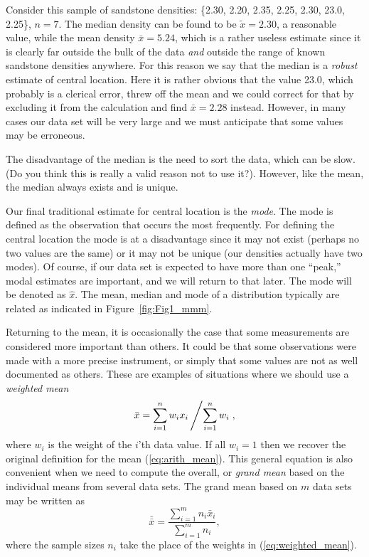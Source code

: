 	Consider this sample of sandstone densities: \{2.30, 2.20, 2.35, 2.25, 2.30, 23.0, 2.25\}, $n = 7$.  
The median density can be found to be $\tilde{x}  = 2.30$, a reasonable value, while the mean density $\bar{x} = 5.24$, 
which is a rather useless estimate since it is clearly far outside the bulk of the data \emph{and} outside
the range of known sandstone densities anywhere.  For this reason we 
say that the median is a \emph{robust} estimate of central location.  Here it is rather obvious that the value 
23.0, which probably is a clerical error, threw off the mean and we could correct for that by excluding
it from the calculation and find $\bar{x} = 2.28$ 
instead.  However, in many cases our data set will be very large and we must anticipate that some 
values may be erroneous.

	The disadvantage of the median is the need to sort the data, which can be slow. (Do you think this is really
a valid reason not to use it?).  However, 
like the mean, the median always exists and is unique.

	Our final traditional estimate for central location is the \emph{mode}.  The mode is defined as 
the observation that occurs the most frequently.  For defining the central location the mode is at a 
disadvantage since it may not exist (perhaps no two values are the same) or it may not be unique (our 
densities actually have two modes).  Of course, if our data set is expected to have more than one ``peak,'' 
modal estimates are important, and we will return to that later.  The mode will be denoted as $\hat{x}$.  
The mean, median and mode of a distribution typically are related as indicated in
Figure~\ref{fig:Fig1_mmm}.
 

	Returning to the mean, it is occasionally the case that some measurements are considered 
more important than others.  It could be that some observations were made with a more precise 
instrument, or simply that some values are not as well documented as others.  These are 
examples of situations where we should use a \emph{weighted mean}
\begin{equation}
\bar{x} = \sum^n_{i=1} w_i x_i \left / \sum^n_{i=1} w_i \right.,
\label{eq:weighted_mean}
\end{equation}
where $w_i$ is the weight of the $i$'th data value.  If all $w_i = 1$ then we recover the original definition for the 
mean (\ref{eq:arith_mean}).  This general equation is also convenient when we need to compute the overall, or
\emph{grand mean} based on the individual means from several data sets.  The grand mean based on $m$ data sets may be 
written as
\begin{equation}
\bar{\bar{x}} = \frac{\sum^m _{i=1} n_i \bar{x}_i}{\sum^m_{i=1} n_i},
\end{equation}
where the sample sizes $n_i$ take the place of the weights in (\ref{eq:weighted_mean}).

